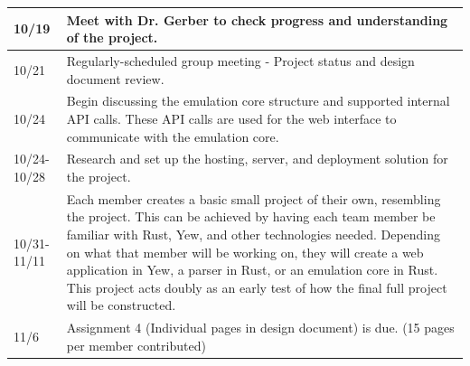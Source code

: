 \documentclass[
    paper=letter,
    parskip=half,
    fontsize=12pt,
    titlepage=firstiscover,
    toc=bibliography,
    numbers=endperiod
]{scrartcl}
\begin{document}
{\begin{tabularx}{\textwidth}{|l|X|}
        10/19         & Meet with Dr. Gerber to check progress and understanding of the project.                                                                                                                                                                                                                                                                                                                                                             \\\hline
        10/21         & Regularly-scheduled group meeting - Project status and design document review.                                                                                                                                                                                                                                                                                                                                                       \\\hline
        10/24         & Begin discussing the emulation core structure and supported internal API calls. These API calls are used for the web interface to communicate with the emulation core.                                                                                                                                                                                                                                                               \\\hline
        10/24-10/28   & Research and set up the hosting, server, and deployment solution for the project.                                                                                                                                                                                                                                                                                                                                                    \\\hline
        10/31-11/11   & Each member creates a basic small project of their own, resembling the project. This can be achieved by having each team member be familiar with Rust, Yew, and other technologies needed. Depending on what that member will be working on, they will create a web application in Yew, a parser in Rust, or an emulation core in Rust. This project acts doubly as an early test of how the final full project will be constructed. \\\hline
        11/6          & Assignment 4 (Individual pages in design document) is due. (15 pages per member contributed)                                                                                                                                                                                                                                                                                                                                         \\\hline

\end{tabularx}}
\end{document}
